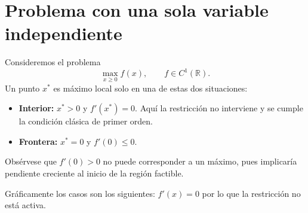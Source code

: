 \documentclass{article}
\begin{document}
\section*{Problema con una sola variable independiente}

Consideremos el problema
\[
\max_{x\ge0}f(x),\qquad f\in C^1(\mathbb{R}).
\]
Un punto \(x^*\) es máximo local solo en una de estas dos situaciones:

\begin{itemize}
  \item \textbf{Interior:} \(x^*>0\) y \(f'(x^*)=0\). Aquí la restricción no interviene y se cumple la condición clásica de primer orden.
  \item \textbf{Frontera:} \(x^*=0\) y \(f'(0)\le0\).  
\end{itemize}

Obsérvese que \(f'(0)>0\) no puede corresponder a un máximo, pues implicaría pendiente creciente al inicio de la región factible.

Gráficamente los casos son los siguientes: $f'(x)=0$ por lo que la restricción no está activa.

\begin{center}
\end{center}
\end{document}
